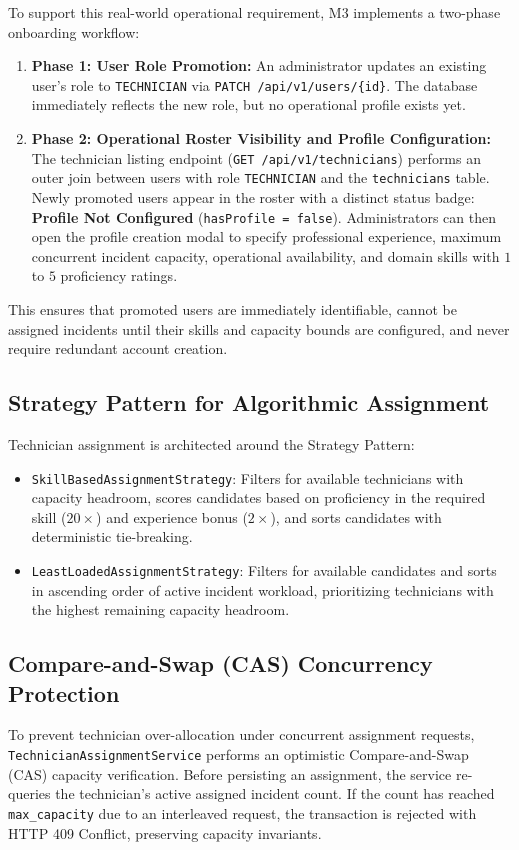 \documentclass[11pt,a4paper,oneside]{report}
\begin{document}
To support this real-world operational requirement, M3 implements a two-phase onboarding workflow:
\begin{enumerate}
    \item \textbf{Phase 1: User Role Promotion:} An administrator updates an existing user's role to \texttt{TECHNICIAN} via \texttt{PATCH /api/v1/users/\{id\}}. The database immediately reflects the new role, but no operational profile exists yet.
    \item \textbf{Phase 2: Operational Roster Visibility and Profile Configuration:} The technician listing endpoint (\texttt{GET /api/v1/technicians}) performs an outer join between users with role \texttt{TECHNICIAN} and the \texttt{technicians} table. Newly promoted users appear in the roster with a distinct status badge: \textbf{Profile Not Configured} (\texttt{hasProfile = false}). Administrators can then open the profile creation modal to specify professional experience, maximum concurrent incident capacity, operational availability, and domain skills with $1$ to $5$ proficiency ratings.
\end{enumerate}
This ensures that promoted users are immediately identifiable, cannot be assigned incidents until their skills and capacity bounds are configured, and never require redundant account creation.

\subsection{Strategy Pattern for Algorithmic Assignment}
Technician assignment is architected around the Strategy Pattern:
\begin{itemize}
    \item \texttt{SkillBasedAssignmentStrategy}: Filters for available technicians with capacity headroom, scores candidates based on proficiency in the required skill ($20\times$) and experience bonus ($2\times$), and sorts candidates with deterministic tie-breaking.
    \item \texttt{LeastLoadedAssignmentStrategy}: Filters for available candidates and sorts in ascending order of active incident workload, prioritizing technicians with the highest remaining capacity headroom.
\end{itemize}

\subsection{Compare-and-Swap (CAS) Concurrency Protection}
To prevent technician over-allocation under concurrent assignment requests, \texttt{TechnicianAssignmentService} performs an optimistic Compare-and-Swap (CAS) capacity verification. Before persisting an assignment, the service re-queries the technician's active assigned incident count. If the count has reached \texttt{max\_capacity} due to an interleaved request, the transaction is rejected with HTTP 409 Conflict, preserving capacity invariants.
\end{document}
